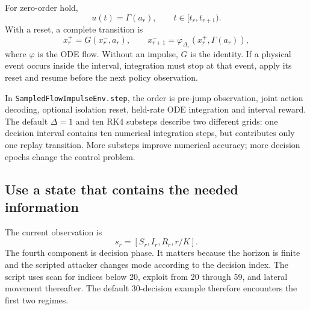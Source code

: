 \documentclass[11pt,a4paper]{article}
\theoremstyle{definition}
\theoremstyle{remark}
\begin{document}
For zero-order hold,
\begin{equation}
u(t)=\Gamma(a_r),\qquad t\in[t_r,t_{r+1}).
\end{equation}
With a reset, a complete transition is
\begin{equation}
x_r^+=G(x_r^-,a_r),\qquad
x_{r+1}^-=\varphi_{\Delta_r}(x_r^+,\Gamma(a_r)),
\label{eq:transition}
\end{equation}
where $\varphi$ is the ODE flow. Without an impulse, $G$ is the identity. If a physical event occurs inside the interval, integration must stop at that event, apply its reset and resume before the next policy observation.

\begin{center}
\end{center}

In \texttt{SampledFlowImpulseEnv.step}, the order is pre-jump observation, joint action decoding, optional isolation reset, held-rate ODE integration and interval reward. The default $\Delta=1$ and ten RK4 substeps describe two different grids: one decision interval contains ten numerical integration steps, but contributes only one replay transition. More substeps improve numerical accuracy; more decision epochs change the control problem.

\subsection{Use a state that contains the needed information}
The current observation is
\begin{equation}
s_r=[S_r,I_r,R_r,r/K].
\label{eq:actual-observation}
\end{equation}
The fourth component is decision phase. It matters because the horizon is finite and the scripted attacker changes mode according to the decision index. The script uses scan for indices below 20, exploit from 20 through 59, and lateral movement thereafter. The default 30-decision example therefore encounters the first two regimes.
\end{document}
